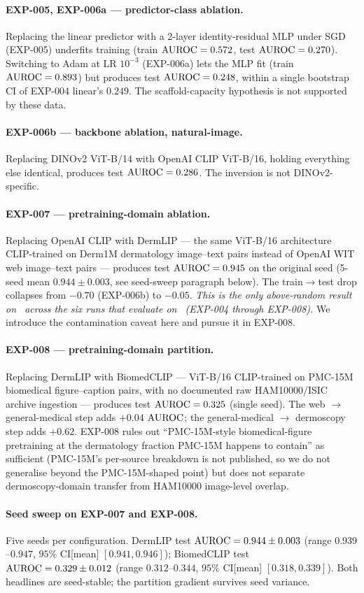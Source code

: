 \paragraph{EXP-005, EXP-006a --- predictor-class ablation.} Replacing the
linear predictor with a 2-layer identity-residual MLP under SGD (EXP-005)
underfits training (train $\mathrm{AUROC} = 0.572$, test $\mathrm{AUROC} = 0.270$).
Switching to Adam at LR $10^{-3}$ (EXP-006a) lets the MLP fit (train
$\mathrm{AUROC} = 0.893$) but produces test $\mathrm{AUROC} = 0.248$, within a single
bootstrap CI of EXP-004 linear's $0.249$. The scaffold-capacity hypothesis
is not supported by these data.

\paragraph{EXP-006b --- backbone ablation, natural-image.} Replacing
DINOv2 ViT-B/14 with OpenAI CLIP ViT-B/16, holding everything else
identical, produces test $\mathrm{AUROC} = 0.286$. The inversion is not
DINOv2-specific.

\paragraph{EXP-007 --- pretraining-domain ablation.} Replacing OpenAI CLIP
with DermLIP --- the same ViT-B/16 architecture CLIP-trained on Derm1M
dermatology image--text pairs instead of OpenAI WIT web image--text pairs ---
produces test $\mathrm{AUROC} = 0.945$ on the original seed (5-seed mean
$0.944 \pm 0.003$, see seed-sweep paragraph below). The train$\to$test
drop collapses from $-0.70$ (EXP-006b) to $-0.05$. \emph{This is the
only above-random result on \strongholdtwo\ across the six runs that
evaluate on \strongholdtwo\ (EXP-004 through EXP-008).} We
introduce the contamination caveat here and pursue it in EXP-008.

\paragraph{EXP-008 --- pretraining-domain partition.} Replacing DermLIP
with BiomedCLIP --- ViT-B/16 CLIP-trained on PMC-15M biomedical
figure--caption pairs, with no documented raw HAM10000/ISIC archive
ingestion --- produces test $\mathrm{AUROC} = 0.325$ (single seed). The web
$\to$ general-medical step adds
$+0.04$ $\mathrm{AUROC}$; the general-medical $\to$ dermoscopy step adds $+0.62$.
EXP-008 rules out ``PMC-15M-style biomedical-figure pretraining at the
dermatology fraction PMC-15M happens to contain'' as sufficient
(PMC-15M's per-source breakdown is not published, so we do not
generalise beyond the PMC-15M-shaped point) but does not separate
dermoscopy-domain transfer from HAM10000 image-level overlap.

\paragraph{Seed sweep on EXP-007 and EXP-008.} Five seeds per
configuration. DermLIP test $\mathrm{AUROC} = 0.944 \pm 0.003$ (range $0.939$--$0.947$,
$95\%$ CI[mean] $[0.941, 0.946]$); BiomedCLIP test $\mathrm{AUROC} = 0.329 \pm 0.012$
(range $0.312$--$0.344$, $95\%$ CI[mean] $[0.318, 0.339]$). Both headlines
are seed-stable; the partition gradient survives seed variance.
